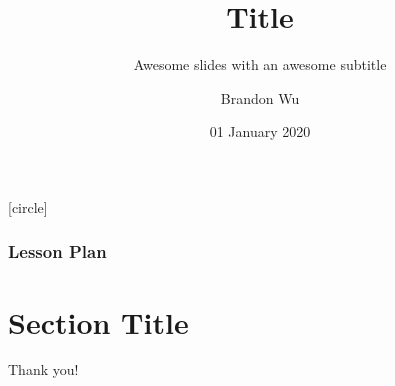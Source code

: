 \documentclass[aspectratio=169]{beamer}
\title{Title} %
\subtitle{Awesome slides with an awesome subtitle} %
\date{01 January 2020} %
\author{Brandon Wu} %
\newif\ifcolorlambda
\begin{document}
\ifweb
    \renewcommand{\pause}{}
\fi

[circle]

{
\begin{frame}[plain]
    \colorlambdatrue
    \titlepage
\end{frame}
}

\begin{frame}[fragile]
  \frametitle{Lesson Plan}

  \tableofcontents
\end{frame}

\section{Section Title}

\begin{frame}[plain]
  \begin{center}
    \huge {}
  \end{center}
\end{frame}

\begin{frame}[plain]
	\begin{center} Thank you! \end{center}
\end{frame}
\end{document}
